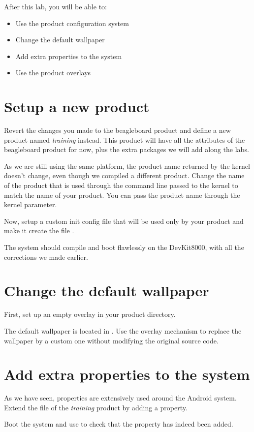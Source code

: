 
After this lab, you will be able to:
\begin{itemize}
  \item Use the product configuration system
  \item Change the default wallpaper
  \item Add extra properties to the system
  \item Use the product overlays
\end{itemize}

\section{Setup a new product}

Revert the changes you made to the beagleboard product and define a new product
named \textit{training} instead. This product will have all the attributes of
the beagleboard product for now, plus the extra packages we will add along the
labs.

As we are still using the same platform, the product name returned by the
kernel doesn't change, even though we compiled a different product. Change
the name of the product that is used through the command line passed to the
kernel to match the name of your product. You can pass the product name through
the  kernel parameter.

Now, setup a custom init config file that will be used only by your product and
make it create the file .

The system should compile and boot flawlessly on the DevKit8000, with all the
corrections we made earlier.

\section{Change the default wallpaper}

First, set up an empty overlay in your product directory.

The default wallpaper is located in .
Use the overlay mechanism to replace the wallpaper by a custom one without
modifying the original source code.

\section{Add extra properties to the system}

As we have seen, properties are extensively used around the Android system.
Extend the  file of the \textit{training} product by adding a
 property.

Boot the system and use  to check that the property has indeed been added.
